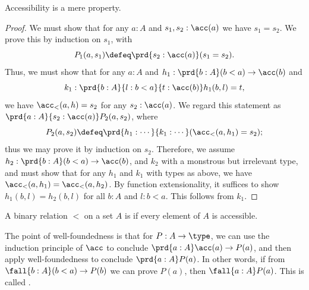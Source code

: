 \begin{lem}
  Accessibility is a mere property.
\end{lem}
\begin{proof}
  We must show that for any $a:A$ and $s_1,s_2:\acc(a)$ we have $s_1=s_2$.
  We prove this by induction on $s_1$, with
  \[P_1(a,s_1) \defeq \prd{s_2:\acc(a)} (s_1=s_2). \]
  Thus, we must show that for any $a:A$ and ${h_1:\prd{b:A} (b<a) \to \acc(b)}$ and
  \[ k_1:{\prd{b:A}{l:b<a}{t:\acc(b)} h_1(b,l) = t},\]
  we have $\acc_<(a,h) = s_2$ for any $s_2:\acc(a)$.
  We regard this statement as $\prd{a:A}{s_2:\acc(a)} P_2(a,s_2)$, where
  \[P_2(a,s_2) \defeq
  \prd{h_1 : \cdots } %
  {k_1 : \cdots} %
  (\acc_<(a,h_1) = s_2);
  \]
  thus we may prove it by induction on $s_2$.
  Therefore, we assume $h_2 : \prd{b:A} (b<a) \to \acc(b)$, and $k_2$ with a monstrous but irrelevant type,
  and must show that for any $h_1$ and $k_1$ with types as above,
  we have $\acc_<(a,h_1) = \acc_<(a,h_2)$.
  By function extensionality, it suffices to show $h_1(b,l) = h_2(b,l)$ for all $b:A$ and $l:b<a$.
  This follows from $k_1$.
\end{proof}

\begin{defn}
  A binary relation $<$ on a set $A$ is 
  if every element of $A$ is accessible.
\end{defn}

The point of well-foundedness is that for $P:A\to \type$, we can use the induction principle of $\acc$ to conclude $\prd{a:A} \acc(a) \to P(a)$, and then apply well-foundedness to conclude $\prd{a:A} P(a)$.
In other words, if from $\fall{b:A} (b<a) \to P(b)$ we can prove $P(a)$, then $\fall{a:A} P(a)$.
This is called .
